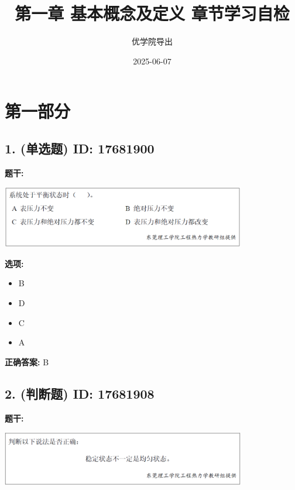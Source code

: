 \documentclass[12pt]{article}
\title{第一章 基本概念及定义   章节学习自检}
\author{优学院导出}
\date{2025-06-07}
\begin{document}
\maketitle

\section*{第一部分}
\hrulefill

\subsection*{1. (单选题) \small ID: 17681900}

\textbf{题干:}


\begin{center}\includegraphics[width=0.8\textwidth, height=0.25\textheight, keepaspectratio]{question_1_17681900/title_img_1.png}\end{center}

\textbf{选项:}
\begin{itemize}[leftmargin=*]
  \item B

  \item D

  \item C

  \item A

\end{itemize}

\textbf{正确答案:}
B

\vspace{0.5em}\hrulefill\vspace{1em}

\subsection*{2. (判断题) \small ID: 17681908}

\textbf{题干:}


\begin{center}\includegraphics[width=0.8\textwidth, height=0.25\textheight, keepaspectratio]{question_2_17681908/title_img_1.png}\end{center}
\end{document}
